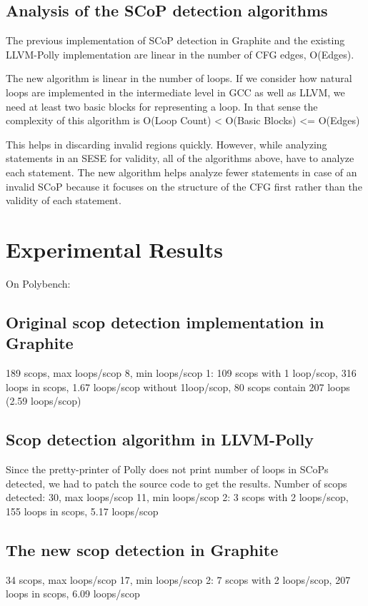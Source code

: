 \documentclass{sigplanconf}
\begin{document}
\subsection{Analysis of the SCoP detection algorithms}
The previous implementation of SCoP detection in Graphite and the existing
LLVM-Polly implementation are linear in the number of CFG edges, O(Edges).

The new algorithm is linear in the number of loops. If we consider how natural
loops are implemented in the intermediate level in GCC as well as LLVM, we need
at least two basic blocks for representing a loop. In that sense the complexity
of this algorithm is O(Loop Count) < O(Basic Blocks) <= O(Edges)

This helps in discarding invalid regions quickly. However, while analyzing
statements in an SESE for validity, all of the algorithms above, have to analyze
each statement.  The new algorithm helps analyze fewer statements in case of an
invalid SCoP because it focuses on the structure of the CFG first rather than
the validity of each statement.

\section{Experimental Results}
On Polybench:
\subsection{Original scop detection implementation in Graphite}
189 scops, max loops/scop 8, min loops/scop 1: 109 scops with 1 loop/scop, 316
loops in scops, 1.67 loops/scop without 1loop/scop, 80 scops contain 207 loops
(2.59 loops/scop)

\subsection{Scop detection algorithm in LLVM-Polly}
Since the pretty-printer of Polly does not print number of loops in SCoPs detected,
we had to patch the source code to get the results.
Number of scops detected: 30, max loops/scop 11, min loops/scop 2: 3 scops with
2 loops/scop, 155 loops in scops, 5.17 loops/scop


\subsection{The new scop detection in Graphite}
34 scops, max loops/scop 17, min loops/scop 2: 7 scops with 2 loops/scop, 207
loops in scops, 6.09 loops/scop
\end{document}
